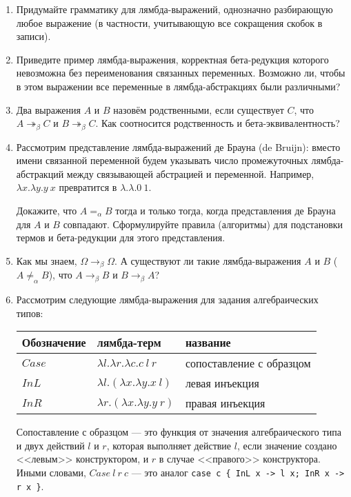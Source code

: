 \documentclass[10pt,a4paper,oneside]{article}
\begin{document}
\begin{enumerate}
\item Придумайте грамматику для лямбда-выражений, однозначно разбирающую любое выражение
(в частности, учитывающую все сокращения скобок в записи).
\item Приведите пример лямбда-выражения, корректная бета-редукция которого невозможна без переименования
связанных переменных. Возможно ли, чтобы в этом выражении все переменные в лямбда-абстракциях
были различными?
\item Два выражения $A$ и $B$ назовём родственными, если существует $C$, что
$A \twoheadrightarrow_\beta C$ и $B \twoheadrightarrow_\beta C$.
Как соотносится родственность и бета-эквивалентность? 

\item Рассмотрим представление лямбда-выражений де Брауна (de Bruijn): вместо имени связанной переменной будем 
указывать число промежуточных лямбда-абстракций между связывающей абстрацией и переменной.
Например, $\lambda x.\lambda y.y\ x$ превратится в $\lambda.\lambda.0\ 1$.

Докажите, что $A =_\alpha B$ тогда и только тогда, когда представления де Брауна для $A$ и $B$ совпадают.
Сформулируйте правила (алгоритмы) для подстановки термов и бета-редукции для этого представления.

\item Как мы знаем, $\Omega \rightarrow_\beta \Omega$. А существуют ли такие лямбда-выражения
$A$ и $B$ ($A \ne_\alpha B$), что $A \rightarrow_\beta B$ и $B \rightarrow_\beta A$?

\item Рассмотрим следующие лямбда-выражения для задания алгебраических типов:

\begin{tabular}{lll}
Обозначение & лямбда-терм & название\\\hline
$Case$ & $\lambda l.\lambda r.\lambda c.c\ l\ r$ & сопоставление с образцом\\
$InL$ & $\lambda l.(\lambda x.\lambda y.x\ l)$ & левая инъекция\\
$InR$ & $\lambda r.(\lambda x.\lambda y.y\ r)$ & правая инъекция\\
\end{tabular}

Сопоставление с образцом --- это функция от значения алгебраического типа и двух действий $l$ и $r$, 
которая выполняет действие $l$, если значение создано <<левым>> конструктором, и $r$ в случае
<<правого>> конструктора. Иными словами, $Case\ l\ r\ c$ --- это аналог
\verb!case c { InL x -> l x; InR x -> r x }!.


\end{enumerate}
\end{document}
